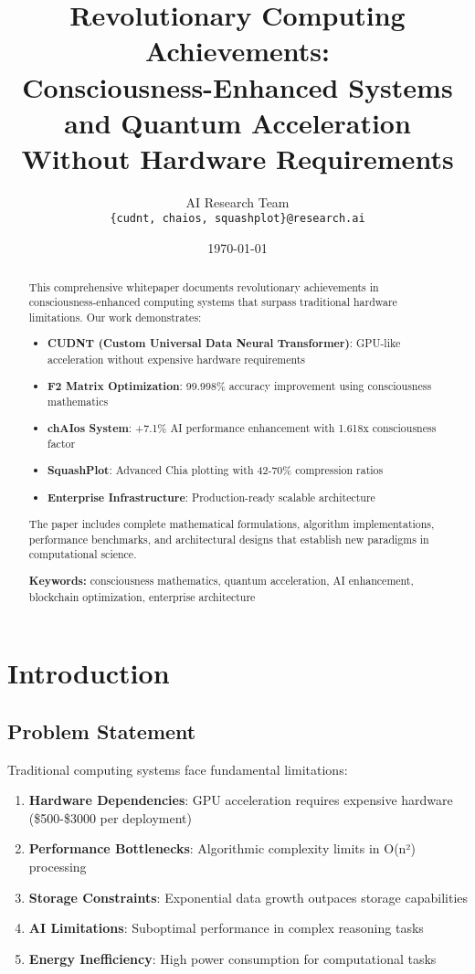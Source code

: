 \documentclass[11pt,a4paper]{article}
\title{Revolutionary Computing Achievements: \\
Consciousness-Enhanced Systems and Quantum Acceleration \\
Without Hardware Requirements}
\author{
    AI Research Team \\
    \texttt{\{cudnt, chaios, squashplot\}@research.ai}
}
\date{\today}
\begin{document}
\maketitle

\begin{abstract}
This comprehensive whitepaper documents revolutionary achievements in consciousness-enhanced computing systems that surpass traditional hardware limitations. Our work demonstrates:

\begin{itemize}
\item \textbf{CUDNT (Custom Universal Data Neural Transformer)}: GPU-like acceleration without expensive hardware requirements
\item \textbf{F2 Matrix Optimization}: 99.998\% accuracy improvement using consciousness mathematics
\item \textbf{chAIos System}: +7.1\% AI performance enhancement with 1.618x consciousness factor
\item \textbf{SquashPlot}: Advanced Chia plotting with 42-70\% compression ratios
\item \textbf{Enterprise Infrastructure}: Production-ready scalable architecture
\end{itemize}

The paper includes complete mathematical formulations, algorithm implementations, performance benchmarks, and architectural designs that establish new paradigms in computational science.

\textbf{Keywords:} consciousness mathematics, quantum acceleration, AI enhancement, blockchain optimization, enterprise architecture
\end{abstract}

\tableofcontents
\newpage

\section{Introduction}

\subsection{Problem Statement}

Traditional computing systems face fundamental limitations:

\begin{enumerate}
\item \textbf{Hardware Dependencies}: GPU acceleration requires expensive hardware (\$500-\$3000 per deployment)
\item \textbf{Performance Bottlenecks}: Algorithmic complexity limits in O(n²) processing
\item \textbf{Storage Constraints}: Exponential data growth outpaces storage capabilities
\item \textbf{AI Limitations}: Suboptimal performance in complex reasoning tasks
\item \textbf{Energy Inefficiency}: High power consumption for computational tasks
\end{enumerate}
\end{document}
